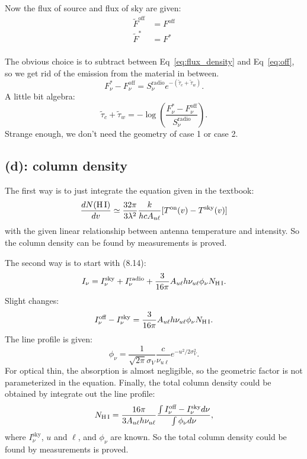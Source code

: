 \documentclass[12pt,letterpaper]{article}
\newcommand{\hi}{\textrm{H\,I}}
\newcommand{\Isky}{I_\nu^{\textrm{sky}}}
\newcommand{\Iradio}{I_\nu^{\textrm{radio}}}
\newcommand{\Snuradio}{S_\nu^{\textrm{radio}}}
\begin{document}
Now the flux of source and flux of sky are given:
\begin{equation}
    \begin{split}
        \tilde{F}^{\textrm{off}} &= F^{\textrm{off}}\\
        \tilde{F}^{\textrm{*}}   &= F^{\textrm{*}}\\
    \end{split}
\end{equation}

The obvious choice is to subtract between Eq~\ref{eq:flux_density} and Eq~\ref{eq:off}, so we get rid of the emission from the material in between.
\begin{equation}
    F_{\nu}^{*} - F^{\textrm{off}}_\nu
    = \Snuradio e^{-(\tilde{\tau}_c + \tilde{\tau}_w)}.
\end{equation}
A little bit algebra:
\begin{equation}
    \tilde{\tau}_c + \tilde{\tau}_w
    = - \log{( \frac{F_{\nu}^{*} - F^{\textrm{off}}_\nu}{\Snuradio} )}.
\end{equation}
Strange enough, we don't need the geometry of case 1 or case 2.

\subsection*{(d): column density}
The first way is to just integrate the equation given in the textbook:
\begin{equation*}
    \frac{dN(\hi)}{dv}
    \simeq \frac{32 \pi }{3 \lambda^2} \frac{k}{hc A_{u\ell}} [T^{\textrm{on}}(v) - T^{\textrm{sky}}(v)]
\end{equation*}
with the given linear relationship between antenna temperature and intensity. 
So the column density can be found by measurements is proved. 

The second way is to start with (8.14):
\begin{equation*}
    I_\nu = \Isky + \Iradio + \frac{3}{16 \pi} A_{u \ell} h \nu_{u\ell} \phi_\nu N_{\hi}.
\end{equation*}
Slight changes:
\begin{equation*}
    I_\nu^{\textrm{off}} - \Isky = \frac{3}{16 \pi} A_{u \ell} h \nu_{u\ell} \phi_\nu N_{\hi}.
\end{equation*}
The line profile is given:
\begin{equation*}
    \phi_\nu = \frac{1}{\sqrt{2\pi} \sigma_V} \frac{c}{\nu_{u \ell}} e^{-u^2 / 2 \sigma_V^2}.
\end{equation*}
For optical thin, the absorption is almost negligible, so the geometric factor is not parameterized in the equation.
Finally, the total column density could be obtained by integrate out the line profile:
\begin{equation}
    N_{\hi} = \frac{16 \pi}{3 A_{u\ell} h \nu_{u \ell}} \frac{\int I_\nu^{\textrm{off}} - \Isky d\nu}{ \int \phi_\nu d\nu },
\end{equation}
where $\Isky$, $u$ and $\ell$, and $\phi_\nu$ are known.
So the total column density could be found by measurements is proved.
\end{document}
